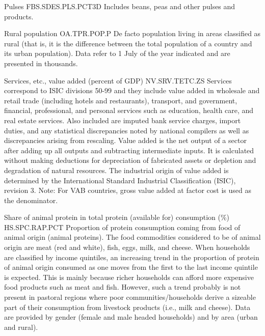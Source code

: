 \begin{MetadataCollection}
\begin{metadata}{ Pulses }{ FBS.SDES.PLS.PCT3D }
Includes beans, peas and other pulses and products. 
\end{metadata}

\begin{metadata}{ Rural population }{ OA.TPR.POP.P }
De facto population living in areas classified as rural (that is, it is the difference between the total population of a country and its urban population). Data refer to 1 July of the year indicated and are presented in thousands. 
\end{metadata}

\begin{metadata}{ Services, etc., value added (percent of GDP) }{ NV.SRV.TETC.ZS }
Services correspond to ISIC divisions 50-99 and they include value added in wholesale and retail trade (including hotels and restaurants), transport, and government, financial, professional, and personal services such as education, health care, and real estate services. Also included are imputed bank service charges, import duties, and any statistical discrepancies noted by national compilers as well as discrepancies arising from rescaling. Value added is the net output of a sector after adding up all outputs and subtracting intermediate inputs. It is calculated without making deductions for depreciation of fabricated assets or depletion and degradation of natural resources. The industrial origin of value added is determined by the International Standard Industrial Classification (ISIC), revision 3. Note: For VAB countries, gross value added at factor cost is used as the denominator. 
\end{metadata}

\begin{metadata}{ Share of animal protein in total protein (available for) consumption (\%) }{ HS.SPC.RAP.PCT }
Proportion of protein consumption coming from food of animal origin (animal proteins). The food commodities considered to be of animal origin are meat (red and white), fish, eggs, milk, and cheese. When households are classified by income quintiles, an increasing trend in the proportion of protein of animal origin consumed as one moves from the first to the last income quintile is expected. This is mainly because richer households can afford more expensive food products such as meat and fish. However, such a trend probably is not present in pastoral regions where poor communities/households derive a sizeable part of their consumption from livestock products (i.e., milk and cheese). Data are provided by gender (female and male headed households) and by area (urban and rural).
\end{metadata}


\end{MetadataCollection}
